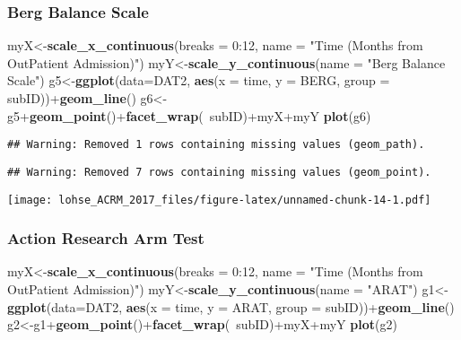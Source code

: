 \documentclass[]{article}
\newenvironment{Shaded}{\begin{snugshade}}{\end{snugshade}}
\newcommand{\KeywordTok}[1]{\textcolor[rgb]{0.13,0.29,0.53}{\textbf{{#1}}}}
\newcommand{\DataTypeTok}[1]{\textcolor[rgb]{0.13,0.29,0.53}{{#1}}}
\newcommand{\DecValTok}[1]{\textcolor[rgb]{0.00,0.00,0.81}{{#1}}}
\newcommand{\StringTok}[1]{\textcolor[rgb]{0.31,0.60,0.02}{{#1}}}
\newcommand{\NormalTok}[1]{{#1}}
\begin{document}
\subsubsection{Berg Balance Scale}\label{berg-balance-scale-1}

\begin{Shaded}
\begin{Highlighting}[]
\NormalTok{myX<-}\KeywordTok{scale_x_continuous}\NormalTok{(}\DataTypeTok{breaks =} \DecValTok{0}\NormalTok{:}\DecValTok{12}\NormalTok{, }
                        \DataTypeTok{name =} \StringTok{"Time (Months from OutPatient Admission)"}\NormalTok{)}
\NormalTok{myY<-}\KeywordTok{scale_y_continuous}\NormalTok{(}\DataTypeTok{name =} \StringTok{"Berg Balance Scale"}\NormalTok{)}
\NormalTok{g5<-}\KeywordTok{ggplot}\NormalTok{(}\DataTypeTok{data=}\NormalTok{DAT2, }\KeywordTok{aes}\NormalTok{(}\DataTypeTok{x =} \NormalTok{time, }\DataTypeTok{y =} \NormalTok{BERG, }\DataTypeTok{group =} \NormalTok{subID))+}\KeywordTok{geom_line}\NormalTok{()}
\NormalTok{g6<-g5+}\KeywordTok{geom_point}\NormalTok{()+}\KeywordTok{facet_wrap}\NormalTok{(~subID)+myX+myY}
\KeywordTok{plot}\NormalTok{(g6)}
\end{Highlighting}
\end{Shaded}

\begin{verbatim}
## Warning: Removed 1 rows containing missing values (geom_path).
\end{verbatim}

\begin{verbatim}
## Warning: Removed 7 rows containing missing values (geom_point).
\end{verbatim}

\texttt{[image: lohse\_ACRM\_2017\_files/figure-latex/unnamed-chunk-14-1.pdf]}

\newpage

\subsubsection{Action Research Arm
Test}\label{action-research-arm-test-1}

\begin{Shaded}
\begin{Highlighting}[]
\NormalTok{myX<-}\KeywordTok{scale_x_continuous}\NormalTok{(}\DataTypeTok{breaks =} \DecValTok{0}\NormalTok{:}\DecValTok{12}\NormalTok{, }
                        \DataTypeTok{name =} \StringTok{"Time (Months from OutPatient Admission)"}\NormalTok{)}
\NormalTok{myY<-}\KeywordTok{scale_y_continuous}\NormalTok{(}\DataTypeTok{name =} \StringTok{"ARAT"}\NormalTok{)}
\NormalTok{g1<-}\KeywordTok{ggplot}\NormalTok{(}\DataTypeTok{data=}\NormalTok{DAT2, }\KeywordTok{aes}\NormalTok{(}\DataTypeTok{x =} \NormalTok{time, }\DataTypeTok{y =} \NormalTok{ARAT, }\DataTypeTok{group =} \NormalTok{subID))+}\KeywordTok{geom_line}\NormalTok{()}
\NormalTok{g2<-g1+}\KeywordTok{geom_point}\NormalTok{()+}\KeywordTok{facet_wrap}\NormalTok{(~subID)+myX+myY}
\KeywordTok{plot}\NormalTok{(g2)}
\end{Highlighting}
\end{Shaded}
\end{document}
